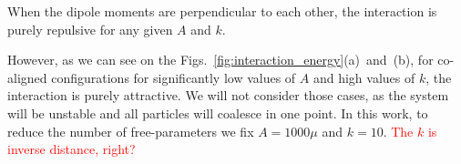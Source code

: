When the dipole moments are perpendicular to each other, the interaction is purely repulsive for any given $A$ and $k$.

However, as we can see on the Figs.~\ref{fig:interaction_energy}(a)~and~(b), for co-aligned configurations for significantly low values of $A$ and high values of $k$, the interaction is purely attractive. We will not consider those cases, as the system will be unstable and all particles will coalesce in one point. In this work, to reduce the number of free-parameters we fix $A = 1000 \mu$ and $k = 10$. \textcolor{red}{The $k$ is inverse distance, right?}
